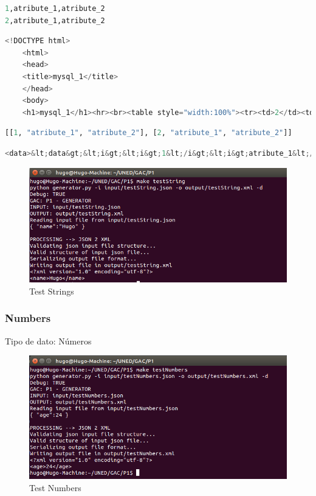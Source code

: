 \documentclass[a4paper,11pt]{book}
\begin{document}
\begin{lstlisting}[language=python,caption={make testServlet }]
1,atribute_1,atribute_2
2,atribute_1,atribute_2
\end{lstlisting}

\begin{lstlisting}[language=python,caption={make testServlet }]
<!DOCTYPE html>
    <html>
    <head>
    <title>mysql_1</title>
    </head>
    <body>
    <h1>mysql_1</h1><hr><br><table style="width:100%"><tr><td>2</td><td>atribute_1</td><td>atribute_2</td></tr></table></body></html> 
\end{lstlisting}

\begin{lstlisting}[language=python,caption={make testServlet }]
[[1, "atribute_1", "atribute_2"], [2, "atribute_1", "atribute_2"]]
\end{lstlisting}


\begin{lstlisting}[language=python,caption={make testServlet }]
<data>&lt;data&gt;&lt;i&gt;&lt;i&gt;1&lt;/i&gt;&lt;i&gt;atribute_1&lt;/i&gt;&lt;i&gt;atribute_2&lt;/i&gt;&lt;/i&gt;&lt;i&gt;&lt;i&gt;2&lt;/i&gt;&lt;i&gt;atribute_1&lt;/i&gt;&lt;i&gt;atribute_2&lt;/i&gt;&lt;/i&gt;&lt;/data&gt;</data>
\end{lstlisting}


\begin{figure}[H]  
\centering 
\includegraphics[scale=0.35]{imagenes/testString.png}
\caption{ Test Strings  }  
\end{figure} 

\subsubsection{Numbers}
Tipo de dato: Números

\begin{figure}[H]  
\centering 
\includegraphics[scale=0.35]{imagenes/testNumbers.png}
\caption{ Test Numbers  }  
\end{figure} 
\end{document}
